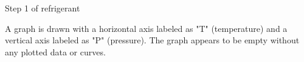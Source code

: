 Step 1 of refrigerant  

A graph is drawn with a horizontal axis labeled as "T" (temperature) and a vertical axis labeled as "P" (pressure). The graph appears to be empty without any plotted data or curves.